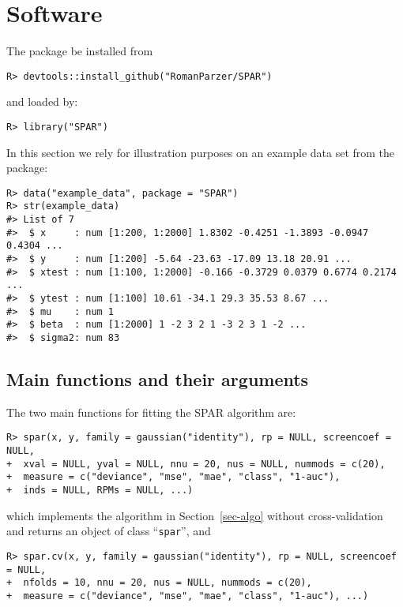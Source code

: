 \documentclass[
  article]{jss}
\begin{document}
\section{Software}\label{sec-software}

The package be installed from 

\begin{verbatim}
R> devtools::install_github("RomanParzer/SPAR")
\end{verbatim}

and loaded by:

\begin{verbatim}
R> library("SPAR")
\end{verbatim}

In this section we rely for illustration purposes on an example data set
from the package:

\begin{verbatim}
R> data("example_data", package = "SPAR")
R> str(example_data)
#> List of 7
#>  $ x     : num [1:200, 1:2000] 1.8302 -0.4251 -1.3893 -0.0947 0.4304 ...
#>  $ y     : num [1:200] -5.64 -23.63 -17.09 13.18 20.91 ...
#>  $ xtest : num [1:100, 1:2000] -0.166 -0.3729 0.0379 0.6774 0.2174 ...
#>  $ ytest : num [1:100] 10.61 -34.1 29.3 35.53 8.67 ...
#>  $ mu    : num 1
#>  $ beta  : num [1:2000] 1 -2 3 2 1 -3 2 3 1 -2 ...
#>  $ sigma2: num 83
\end{verbatim}

\subsection{Main functions and their
arguments}\label{main-functions-and-their-arguments}

The two main functions for fitting the SPAR algorithm are:

\begin{verbatim}
R> spar(x, y, family = gaussian("identity"), rp = NULL, screencoef = NULL,
+  xval = NULL, yval = NULL, nnu = 20, nus = NULL, nummods = c(20),
+  measure = c("deviance", "mse", "mae", "class", "1-auc"),
+  inds = NULL, RPMs = NULL, ...)
\end{verbatim}

which implements the algorithm in Section~\ref{sec-algo} without
cross-validation and returns an object of class ``\texttt{spar}'', and

\begin{verbatim}
R> spar.cv(x, y, family = gaussian("identity"), rp = NULL, screencoef = NULL,
+  nfolds = 10, nnu = 20, nus = NULL, nummods = c(20),
+  measure = c("deviance", "mse", "mae", "class", "1-auc"), ...)
\end{verbatim}
\end{document}
